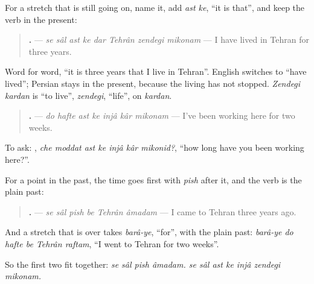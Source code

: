 \begin{grammarlens}[title={Grammar Lens: ... ast ke, with the present}]
For a stretch that is still going on, name it, add \emph{ast ke}, \textquotedblleft{}it is that\textquotedblright{}, and keep the verb in the present:

\begin{quote}
\textbf{       .} — \emph{se sâl ast ke dar Tehrân zendegi mikonam} — I have lived in Tehran for three years.
\end{quote}

Word for word, \textquotedblleft{}it is three years that I live in Tehran\textquotedblright{}. English switches to \textquotedblleft{}have lived\textquotedblright{}; Persian stays in the present, because the living has not stopped. \emph{Zendegi kardan} is \textquotedblleft{}to live\textquotedblright{}, \emph{zendegi}, \textquotedblleft{}life\textquotedblright{}, on \emph{kardan}.

\begin{quote}
\textbf{      .} — \emph{do hafte ast ke injâ kâr mikonam} — I've been working here for two weeks.
\end{quote}

To ask: \textbf{      }, \emph{che moddat ast ke injâ kâr mikonid?}, \textquotedblleft{}how long have you been working here?\textquotedblright{}.
\end{grammarlens}

\begin{grammarlens}[title={Grammar Lens: pish, with the plain past}]
For a point in the past, the time goes first with \emph{pish} after it, and the verb is the plain past:

\begin{quote}
\textbf{     .} — \emph{se sâl pish be Tehrân âmadam} — I came to Tehran three years ago.
\end{quote}

And a stretch that is over takes \emph{barâ-ye}, \textquotedblleft{}for\textquotedblright{}, with the plain past: \emph{barâ-ye do hafte be Tehrân raftam}, \textquotedblleft{}I went to Tehran for two weeks\textquotedblright{}.

So the first two fit together: \emph{se sâl pish âmadam. se sâl ast ke injâ zendegi mikonam.}
\end{grammarlens}

